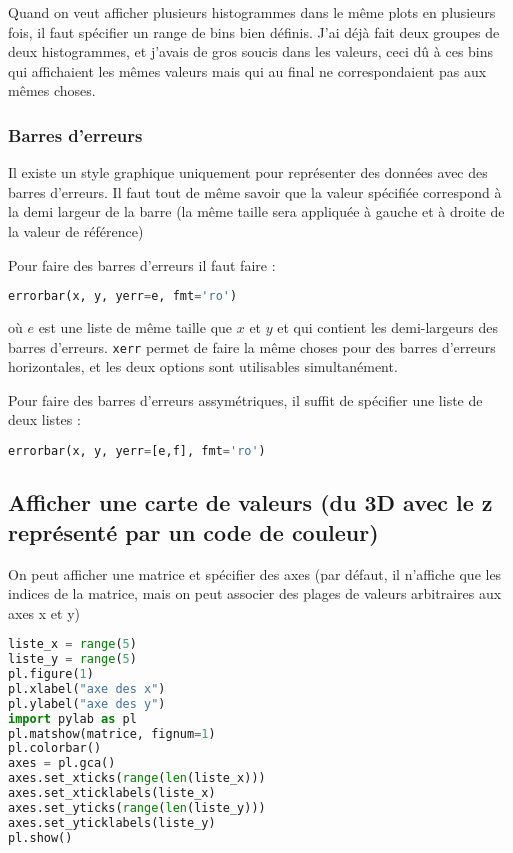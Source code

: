 \documentclass[a4paper,twoside]{article}
\begin{document}
\begin{attention}
Quand on veut afficher plusieurs histogrammes dans le même plots en plusieurs fois, il faut spécifier un range de bins bien définis. J'ai déjà fait deux groupes de deux histogrammes, et j'avais de gros soucis dans les valeurs, ceci dû à ces bins qui affichaient les mêmes valeurs mais qui au final ne correspondaient pas aux mêmes choses.
\end{attention}

\subsubsection{Barres d'erreurs}
Il existe un style graphique uniquement pour représenter des données avec des barres d'erreurs. Il faut tout de même savoir que la valeur spécifiée correspond à la demi largeur de la barre (la même taille sera appliquée à gauche et à droite de la valeur de référence)

Pour faire des barres d'erreurs il faut faire : 
\begin{lstlisting}[language=python]
errorbar(x, y, yerr=e, fmt='ro')
\end{lstlisting}
où $e$ est une liste de même taille que $x$ et $y$ et qui contient les demi-largeurs des barres d'erreurs. \texttt{xerr} permet de faire la même choses pour des barres d'erreurs horizontales, et les deux options sont utilisables simultanément.

\bigskip

Pour faire des barres d'erreurs assymétriques, il suffit de spécifier une liste de deux listes : 
\begin{lstlisting}[language=python]
errorbar(x, y, yerr=[e,f], fmt='ro')
\end{lstlisting}

\subsection{Afficher une carte de valeurs (du 3D avec le z représenté par un code de couleur)}
On peut afficher une matrice et spécifier des axes (par défaut, il n'affiche que les indices de la matrice, mais on peut associer des plages de valeurs arbitraires aux axes x et y)

\begin{lstlisting}[language=python]
liste_x = range(5)
liste_y = range(5)
pl.figure(1)
pl.xlabel("axe des x")
pl.ylabel("axe des y")
import pylab as pl
pl.matshow(matrice, fignum=1)
pl.colorbar()
axes = pl.gca()
axes.set_xticks(range(len(liste_x)))
axes.set_xticklabels(liste_x)
axes.set_yticks(range(len(liste_y)))
axes.set_yticklabels(liste_y)
pl.show()
\end{lstlisting}
\end{document}
